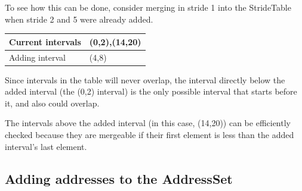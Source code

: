 \documentclass[12pt,twoside]{reedthesis}
\begin{document}
			To see how this can be done, consider merging in stride 1 into the StrideTable when stride 2 and 5 were already added. 
			
			
			\newcommand{\bcl}{\cellcolor{black!50}}
			\begin{tabular}{ |l|l| } 
				\hline
				Current intervals & (0,2),(14,20) \\ 
				\hline
				Adding interval & (4,8) \\ 
				\hline
			\end{tabular}
			
			Since intervals in the table will never overlap, the interval directly below the added interval (the (0,2) interval) is the only possible interval that starts before it, and also could overlap.%
			
			The intervals above the added interval (in this case, (14,20)) can be efficiently checked because they are mergeable if their first element is less than the added interval's last element. %
			
			
			
		\subsection{Adding addresses to the AddressSet}\label{s:access-set}
			
			
\end{document}
